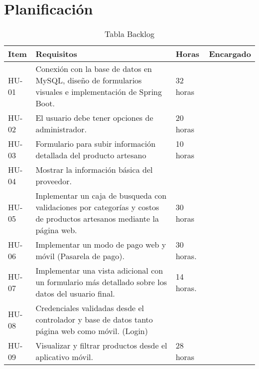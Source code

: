 \chapter{Planificación}


\begin{table}[htbp]
	\begin{center}
		\begin{tabular}{|p{2.5cm}|p{6.5cm}|p{2.5cm}|p{2.5cm}|}
			\hline
			Item & Requisitos & Horas & Encargado\\
			\hline \hline
			HU-01 & Conexión con la base de datos en MySQL, diseño de formularios visuales e implementación de Spring Boot. & 32 horas & \\ \hline
			HU-02 & El usuario debe tener opciones de administrador. & 20 horas & \\ \hline
			HU-03 & Formulario para subir información detallada del producto artesano & 10 horas  & \\ \hline
			HU-04 & Mostrar la información básica del proveedor. &  & \\ \hline
			HU-05 & Inplementar un caja de busqueda con validaciones por categorías y costos de productos artesanos mediante la página web. & 30 horas & \\ \hline
			HU-06 & Implementar un modo de pago web y móvil (Pasarela de pago). & 30 horas. & \\ \hline
			HU-07 & Implementar una vista adicional con un formulario más detallado sobre los datos del usuario final.  & 14 horas. & \\ \hline
			HU-08 & Credenciales validadas desde el controlador y base de datos tanto página web como móvil. (Login) &    & \\ \hline
			HU-09 & Visualizar y filtrar productos desde el aplicativo móvil. & 28 horas & \\ \hline			
			
			
		\end{tabular}
		\caption{Tabla Backlog}
		\label{tabla:sencilla}
	\end{center}
\end{table}
